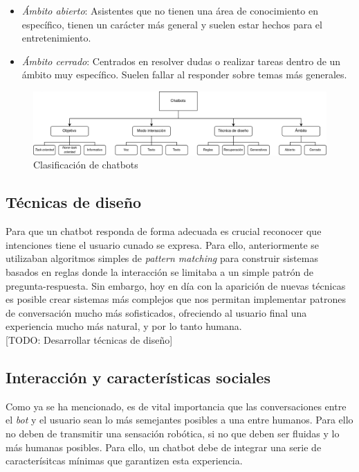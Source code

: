 \begin{itemize}
	\item \textit{Ámbito  abierto}: Asistentes que no tienen una área de conocimiento en específico, tienen un carácter más general y suelen estar hechos para el entretenimiento.
	\item \textit{Ámbito cerrado}: Centrados en resolver dudas o realizar tareas dentro de un ámbito muy específico. Suelen  fallar al responder sobre temas más generales.
\end{itemize}


\begin{figure}[htbp]
\centering
\includegraphics[scale=0.25]{../images/clasificacionChatbots.png} 
\caption{Clasificación de chatbots}
\label{fig:x clasificacion chatbots}
\end{figure}

 
 
\subsection{Técnicas de diseño }
Para que un chatbot responda de forma adecuada es crucial reconocer que intenciones tiene el usuario cunado se expresa. Para ello, anteriormente se utilizaban algoritmos simples de \textit{pattern matching} para construir sistemas basados en reglas donde la interacción se limitaba a un simple patrón de pregunta-respuesta. Sin embargo, hoy en día con la aparición de nuevas técnicas es posible crear sistemas más complejos que nos permitan implementar patrones de conversación mucho más sofisticados, ofreciendo al usuario final una experiencia mucho más natural, y por lo tanto humana. \\


[TODO: Desarrollar técnicas de diseño]


\subsection{Interacción y características sociales}
Como ya se ha mencionado, es de vital importancia que las conversaciones entre el \textit{bot} y el usuario sean lo más semejantes posibles a una entre humanos. Para ello no deben de transmitir una sensación robótica, si no que deben ser fluidas y lo más humanas posibles. Para ello, un chatbot debe de integrar una serie de caracterísitcas mínimas que garantizen esta experiencia.\\

